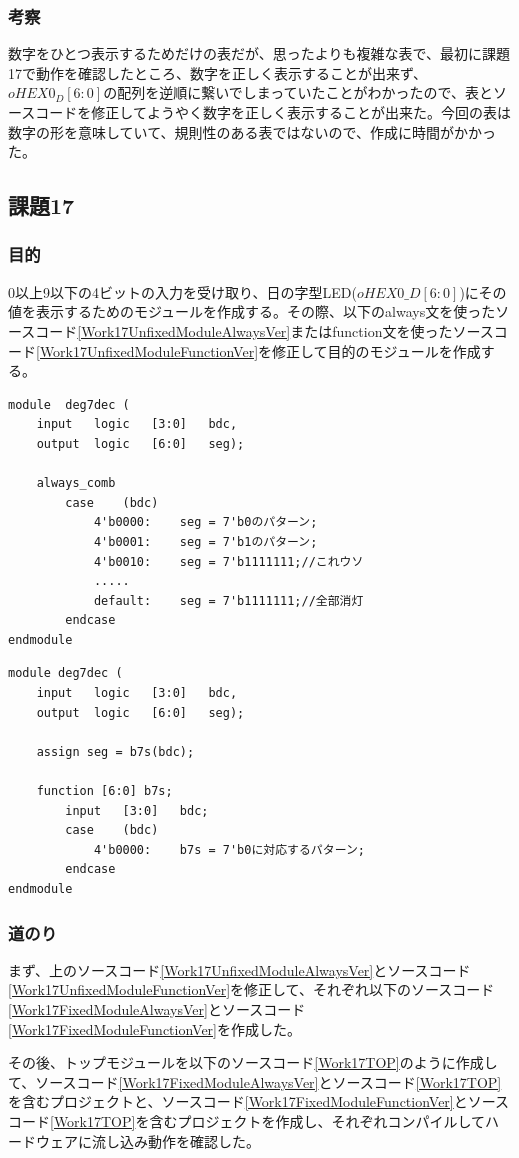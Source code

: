 \documentclass[a4paper]{jarticle}
\begin{document}
\subsubsection{考察}
数字をひとつ表示するためだけの表だが、思ったよりも複雑な表で、最初に課題17で動作を確認したところ、数字を正しく表示することが出来ず、$oHEX0_D[6:0]$の配列を逆順に繋いでしまっていたことがわかったので、表とソースコードを修正してようやく数字を正しく表示することが出来た。今回の表は数字の形を意味していて、規則性のある表ではないので、作成に時間がかかった。
\subsection{課題17}
\subsubsection{目的}
0以上9以下の4ビットの入力を受け取り、日の字型LED($oHEX0\_D\left[6:0\right]$)にその値を表示するためのモジュールを作成する。その際、以下のalways文を使ったソースコード\ref{Work17UnfixedModuleAlwaysVer}またはfunction文を使ったソースコード\ref{Work17UnfixedModuleFunctionVer}を修正して目的のモジュールを作成する。
\begin{lstlisting}[caption=always文版,label=Work17UnfixedModuleAlwaysVer]
module	deg7dec (
	input	logic	[3:0]	bdc,
	output	logic	[6:0]	seg);

	always_comb
		case	(bdc)
			4'b0000:	seg = 7'b0のパターン;
			4'b0001:	seg = 7'b1のパターン;
			4'b0010:	seg = 7'b1111111;//これウソ
			.....
			default:	seg = 7'b1111111;//全部消灯
		endcase
endmodule
\end{lstlisting}
\begin{lstlisting}[caption=function文版,label=Work17UnfixedModuleFunctionVer]
module deg7dec (
	input	logic	[3:0]	bdc,
	output	logic	[6:0]	seg);

	assign seg = b7s(bdc);

	function [6:0] b7s;
		input	[3:0]	bdc;
		case	(bdc)
			4'b0000:	b7s = 7'b0に対応するパターン;
		endcase
endmodule
\end{lstlisting}
\subsubsection{道のり}
まず、上のソースコード\ref{Work17UnfixedModuleAlwaysVer}とソースコード\ref{Work17UnfixedModuleFunctionVer}を修正して、それぞれ以下のソースコード\ref{Work17FixedModuleAlwaysVer}とソースコード\ref{Work17FixedModuleFunctionVer}を作成した。


その後、トップモジュールを以下のソースコード\ref{Work17TOP}のように作成して、ソースコード\ref{Work17FixedModuleAlwaysVer}とソースコード\ref{Work17TOP}を含むプロジェクトと、ソースコード\ref{Work17FixedModuleFunctionVer}とソースコード\ref{Work17TOP}を含むプロジェクトを作成し、それぞれコンパイルしてハードウェアに流し込み動作を確認した。

\end{document}
